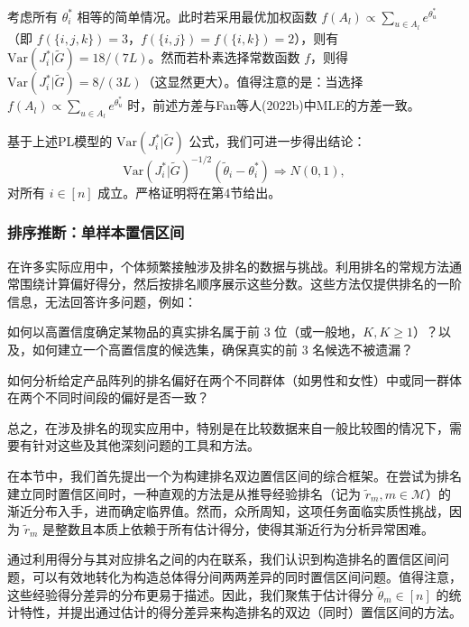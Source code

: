 考虑所有 $\theta_{i}^{*}$ 相等的简单情况。此时若采用最优加权函数 $f(A_{l})\propto \sum_{u\in A_{l}}e^{\theta_{u}^{*}}$（即 $f(\{i,j,k\}) = 3$，$f(\{i,j\}) = f(\{i,k\}) = 2$），则有 $\mathrm{Var}(J_i^* |\widetilde{G}) = 18 / (7L)$。然而若朴素选择常数函数 $f$，则得 $\mathrm{Var}(J_i^* |\widetilde{G}) = 8 / (3L)$（这显然更大）。值得注意的是：当选择 $f(A_{l})\propto \sum_{u\in A_{l}}e^{\theta_{u}^{*}}$ 时，前述方差与Fan等人(2022b)中MLE的方差一致。

基于上述PL模型的 $\mathrm{Var}(J_i^* |\widetilde{G})$ 公式，我们可进一步得出结论：
$$
\mathrm{Var}(J_i^* |\widetilde{G})^{-1 / 2}(\widetilde{\theta}_i - \theta_i^*)\Rightarrow N(0,1),
$$
对所有 $i\in [n]$ 成立。严格证明将在第4节给出。

\subsubsection{排序推断：单样本置信区间}

在许多实际应用中，个体频繁接触涉及排名的数据与挑战。利用排名的常规方法通常围绕计算偏好得分，然后按排名顺序展示这些分数。这些方法仅提供排名的一阶信息，无法回答许多问题，例如：

如何以高置信度确定某物品的真实排名属于前 3 位（或一般地，$K, K \geq 1$）？以及，如何建立一个高置信度的候选集，确保真实的前 3 名候选不被遗漏？

如何分析给定产品阵列的排名偏好在两个不同群体（如男性和女性）中或同一群体在两个不同时间段的偏好是否一致？

总之，在涉及排名的现实应用中，特别是在比较数据来自一般比较图的情况下，需要有针对这些及其他深刻问题的工具和方法。

在本节中，我们首先提出一个为构建排名双边置信区间的综合框架。在尝试为排名建立同时置信区间时，一种直观的方法是从推导经验排名（记为 $\widetilde{r}_{m}, m\in \mathcal{M}$）的渐近分布入手，进而确定临界值。然而，众所周知，这项任务面临实质性挑战，因为 $\widetilde{r}_{m}$ 是整数且本质上依赖于所有估计得分，使得其渐近行为分析异常困难。

通过利用得分与其对应排名之间的内在联系，我们认识到构造排名的置信区间问题，可以有效地转化为构造总体得分间两两差异的同时置信区间问题。值得注意，这些经验得分差异的分布更易于描述。因此，我们聚焦于估计得分 $\widetilde{\theta}_{m} \in [n]$ 的统计特性，并提出通过估计的得分差异来构造排名的双边（同时）置信区间的方法。

